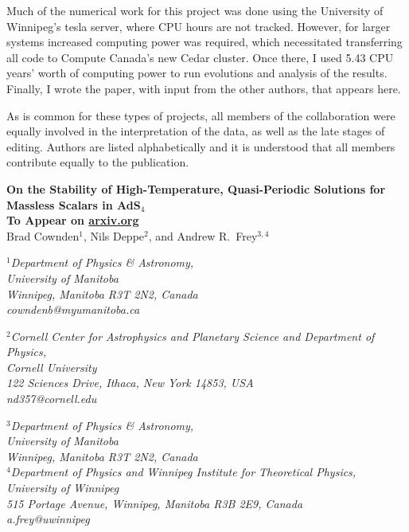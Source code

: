 \documentclass[../PhD.tex]{subfiles}
\begin{document}
Much of the numerical work for this project was done using the University of Winnipeg's tesla server, where CPU hours are not tracked. However, for larger systems increased computing power was required, which necessitated transferring all code to Compute Canada's new Cedar cluster. Once there, I used 5.43 CPU years' worth of computing power to run evolutions and analysis of the results. Finally, I wrote the paper, with input from the other authors, that appears here.

As is common for these types of projects, all members of the collaboration were equally involved in the interpretation of the data, as well as the late stages of editing. Authors are listed alphabetically and it is understood that all members contribute equally to the publication.

\newpage


\begin{center}
{\bf{\Large On the Stability of High-Temperature, Quasi-Periodic Solutions for Massless Scalars in AdS$_4$}} \\
\bigskip
{\bf To Appear on \href{https://arxiv.org}{arxiv.org}} \\
\bigskip
\bigskip
Brad Cownden$^1$, Nils Deppe$^2$, and Andrew R.~Frey$^{3,4}$\\
\bigskip

$^1${\it Department of Physics \& Astronomy,\\ University of Manitoba\\
Winnipeg, Manitoba R3T 2N2, Canada \\ {\rm cowndenb@myumanitoba.ca}} \\
\vspace{0.1in}

$^2${\it Cornell Center for Astrophysics and Planetary Science and
Department of Physics,\\ Cornell University\\
122 Sciences Drive, Ithaca, New York 14853, USA \\ {\rm nd357@cornell.edu}} \\
\vspace{0.1in}

$^3${\it Department of Physics \& Astronomy,\\ University of Manitoba\\
Winnipeg, Manitoba R3T 2N2, Canada} \\
$^4${\it Department of Physics and Winnipeg Institute for Theoretical
Physics,\\ University of Winnipeg\\
515 Portage Avenue, Winnipeg, Manitoba R3B 2E9, Canada \\ {\rm a.frey@uwinnipeg}}
\end{center}
\end{document}
